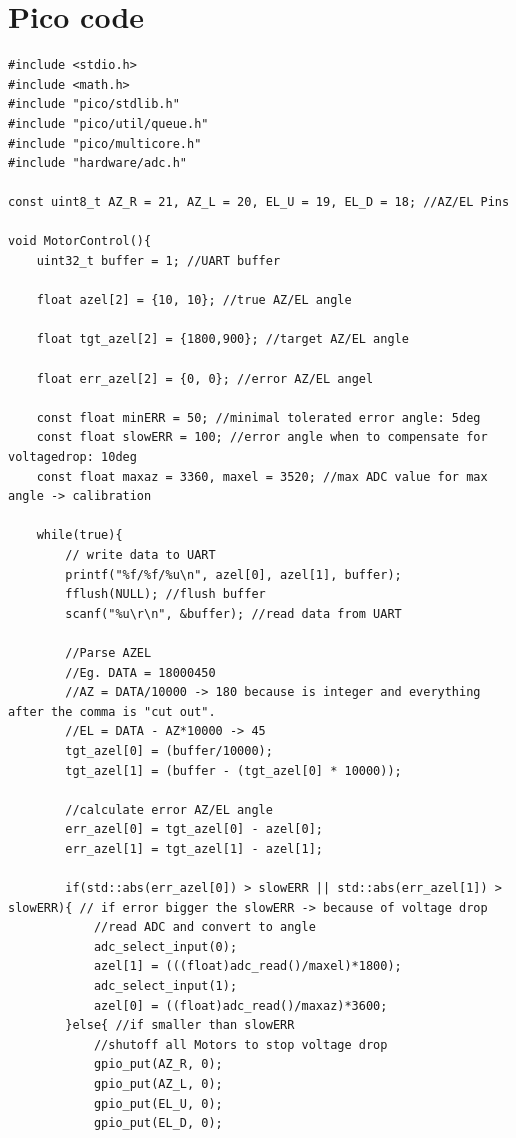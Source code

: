 \documentclass{article}
\begin{document}
\newpage

\section*{Pico code}
\begin{lstlisting}
#include <stdio.h>
#include <math.h>
#include "pico/stdlib.h"
#include "pico/util/queue.h"
#include "pico/multicore.h"
#include "hardware/adc.h"

const uint8_t AZ_R = 21, AZ_L = 20, EL_U = 19, EL_D = 18; //AZ/EL Pins

void MotorControl(){
    uint32_t buffer = 1; //UART buffer

    float azel[2] = {10, 10}; //true AZ/EL angle

    float tgt_azel[2] = {1800,900}; //target AZ/EL angle

    float err_azel[2] = {0, 0}; //error AZ/EL angel
    
    const float minERR = 50; //minimal tolerated error angle: 5deg
    const float slowERR = 100; //error angle when to compensate for voltagedrop: 10deg
    const float maxaz = 3360, maxel = 3520; //max ADC value for max angle -> calibration

    while(true){
        // write data to UART
        printf("%f/%f/%u\n", azel[0], azel[1], buffer);
        fflush(NULL); //flush buffer
        scanf("%u\r\n", &buffer); //read data from UART

        //Parse AZEL
        //Eg. DATA = 18000450
        //AZ = DATA/10000 -> 180 because is integer and everything after the comma is "cut out".
        //EL = DATA - AZ*10000 -> 45
        tgt_azel[0] = (buffer/10000);
        tgt_azel[1] = (buffer - (tgt_azel[0] * 10000));

        //calculate error AZ/EL angle
        err_azel[0] = tgt_azel[0] - azel[0];
        err_azel[1] = tgt_azel[1] - azel[1];

        if(std::abs(err_azel[0]) > slowERR || std::abs(err_azel[1]) > slowERR){ // if error bigger the slowERR -> because of voltage drop
            //read ADC and convert to angle
            adc_select_input(0);
            azel[1] = (((float)adc_read()/maxel)*1800);
            adc_select_input(1);
            azel[0] = ((float)adc_read()/maxaz)*3600;
        }else{ //if smaller than slowERR
            //shutoff all Motors to stop voltage drop
            gpio_put(AZ_R, 0);
            gpio_put(AZ_L, 0);
            gpio_put(EL_U, 0);
            gpio_put(EL_D, 0);


\end{lstlisting}
\end{document}
